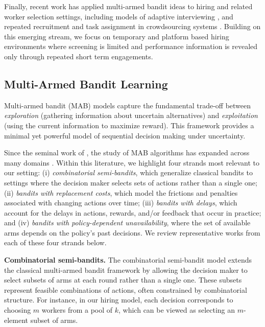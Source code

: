 \documentclass[opre,blindrev]{informs3}
\begin{document}
Finally, recent work has applied multi-armed bandit ideas to hiring and related worker selection settings, including models of adaptive interviewing \citep{schumann2019making}, and repeated recruitment and task assignment in crowdsourcing systems \citep{gao2020combinatorial, rangi2018multi}. Building on this emerging stream, we focus on temporary and platform based hiring environments where screening is limited and performance information is revealed only through repeated short term engagements. 



\vspace{-.1in}

\subsection{Multi-Armed Bandit Learning}\label{sec:bandit-related-work}
Multi-armed bandit (MAB) models capture the fundamental trade-off between \emph{exploration} (gathering information about uncertain alternatives) and \emph{exploitation} (using the current information to maximize reward). This framework provides a minimal yet powerful model of sequential decision making under uncertainty. 

Since the seminal work of \cite{lai1985asymptotically}, the study of MAB algorithms has expanded across many domains \citep{bouneffouf2020survey}.
Within this literature, we highlight four strands most relevant to our setting: (i) \emph{combinatorial semi-bandits}, which generalize classical bandits to settings where the decision maker selects sets of actions rather than a single one; (ii) \emph{bandits with replacement costs}, which model the frictions and penalties associated with changing actions over time; (iii) \emph{bandits with delays}, which account for the delays in actions, rewards, and/or feedback that occur in practice; and (iv) \emph{bandits with policy-dependent unavailability}, where the set of available arms depends on the policy's past decisions. We review representative works from each of these four strands below. 

{\bf Combinatorial semi-bandits.}
The combinatorial semi-bandit model \cite{cesa2012combinatorial, chen2013combinatorial} extends the classical multi-armed bandit framework by allowing the decision maker to select subsets of arms at each round rather than a single one. These subsets represent feasible combinations of actions, often constrained by combinatorial structure. For instance, in our hiring model, each decision corresponds to choosing \(m\) workers from a pool of \(k\), which can be viewed as selecting an \(m\)-element subset of arms.
\end{document}
